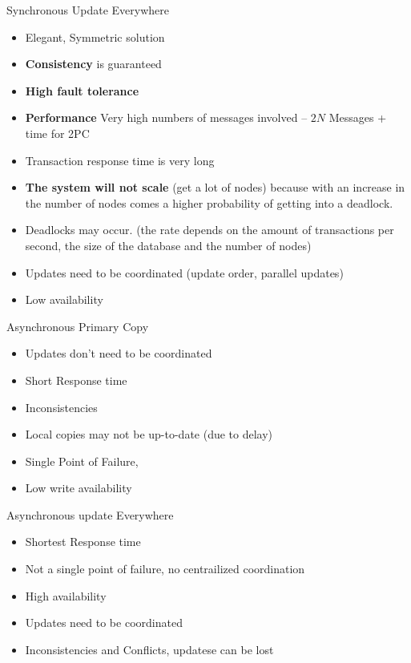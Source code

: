 \documentclass[a4paper,12pt]{article}%
\begin{document}
 
 Synchronous Update Everywhere
 
 {\color[HTML]{9AB299} 
 \begin{itemize}
  \item Elegant, Symmetric solution
  \item {\bf Consistency} is guaranteed
  \item {\bf High fault tolerance}
 \end{itemize}

 }   
{\color[HTML]{A38C8C}
 \begin{itemize}
  \item {\bf Performance} Very high numbers of messages involved -- $2N$ Messages + time for 2PC
  \item Transaction response time is very long
  \item {\bf The system will not scale} (get a lot of nodes) because with an increase in the number of nodes comes a higher probability of getting into a deadlock.
  \item Deadlocks may occur. (the rate depends on the amount of transactions per second, the size of the database and the number of nodes)
  
  \item Updates need to be coordinated (update order, parallel updates)
  \item Low availability
 \end{itemize}
 }
 

 Asynchronous Primary Copy
 
 {\color[HTML]{9AB299} 
 \begin{itemize}
  \item Updates don't need to be coordinated
  \item Short Response time
 \end{itemize}

 }   
{\color[HTML]{A38C8C}
 \begin{itemize}
 \item Inconsistencies 
 \item Local copies may not be up-to-date (due to delay)
 \item Single Point of Failure,
 \item Low write availability
 \end{itemize}
 }

 
 
 Asynchronous update Everywhere
 
 {\color[HTML]{9AB299} 
 \begin{itemize}
  \item Shortest Response time
  \item Not a single point of failure, no centrailized coordination
  \item High availability
 \end{itemize}

 }   
{\color[HTML]{A38C8C}
 \begin{itemize}
 \item Updates need to be coordinated
 \item Inconsistencies and Conflicts, updatese can be lost 
 \end{itemize}
 }
 
\end{document}
